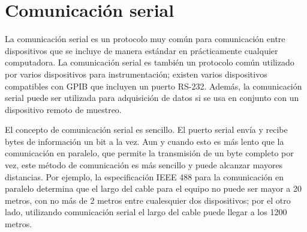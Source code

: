 \documentclass[11pt,letterpaper]{report}
\begin{document}
		\section{Comunicación serial}
		La comunicación serial es un protocolo muy común para comunicación entre dispositivos que se incluye de manera estándar en prácticamente cualquier computadora. La comunicación serial es también un protocolo común utilizado por varios dispositivos para instrumentación; existen varios dispositivos compatibles con GPIB que incluyen un puerto RS-232. Además, la comunicación serial puede ser utilizada para adquisición de datos si se usa en conjunto con un dispositivo remoto de muestreo\citep{tamayo2009}.
		
		El concepto de comunicación serial es sencillo. El puerto serial envía y recibe bytes de información un bit a la vez. Aun y cuando esto es más lento que la comunicación en paralelo, que permite la transmisión de un byte completo por vez, este método de comunicación es más sencillo y puede alcanzar mayores distancias. Por ejemplo, la especificación IEEE 488 para la comunicación en paralelo determina que el largo del cable para el equipo no puede ser mayor a 20 metros, con no más de 2 metros entre cualesquier dos dispositivos; por el otro lado, utilizando comunicación serial el largo del cable puede llegar a los 1200 metros\citep{tamayo2009}.
		
\end{document}

